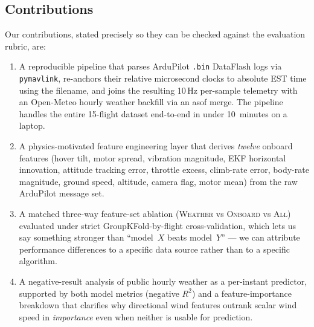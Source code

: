 \documentclass[sigconf, nonacm]{acmart}
\begin{document}
\subsection{Contributions}
Our contributions, stated precisely so they can be checked against the
evaluation rubric, are:
\begin{enumerate}[leftmargin=1.2em]
  \item A reproducible pipeline that parses ArduPilot \texttt{.bin}
  DataFlash logs via \texttt{pymavlink}, re-anchors their relative
  microsecond clocks to absolute EST time using the filename, and joins
  the resulting 10\,Hz per-sample telemetry with an Open-Meteo hourly
  weather backfill via an asof merge.  The pipeline handles the entire
  15-flight dataset end-to-end in under 10~minutes on a laptop.
  \item A physics-motivated feature engineering layer that derives
  \emph{twelve} onboard features (hover tilt, motor spread, vibration
  magnitude, EKF horizontal innovation, attitude tracking error, throttle
  excess, climb-rate error, body-rate magnitude, ground speed, altitude,
  camera flag, motor mean) from the raw ArduPilot message set.
  \item A matched three-way feature-set ablation (\textsc{Weather} vs
  \textsc{Onboard} vs \textsc{All}) evaluated under strict
  GroupKFold-by-flight cross-validation, which lets us say something
  stronger than ``model~$X$ beats model~$Y$'' ---  we can attribute
  performance differences to a specific data source rather than to a
  specific algorithm.
  \item A negative-result analysis of public hourly weather as a
  per-instant predictor, supported by both model metrics (negative
  $R^2$) and a feature-importance breakdown that clarifies why
  directional wind features outrank scalar wind speed in
  \emph{importance} even when neither is usable for prediction.
\end{enumerate}
\end{document}
